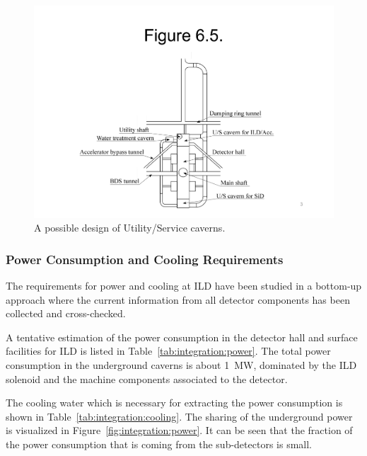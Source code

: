 \begin{figure}[h!]
\centering
\includegraphics[width=1.0\hsize]{Integration/fig/underground.pdf}
\caption{\label{fig:integration:USC}A possible design of Utility/Service caverns. }
\end{figure}

\subsubsection{Power Consumption and Cooling Requirements}
\label{ild:sec:power}
The requirements for power and cooling at ILD have been studied in a bottom-up approach where the current information from all detector components has been collected and cross-checked.

A tentative estimation of the power consumption in the detector hall and surface facilities for ILD is listed in Table~\ref{tab:integration:power}. The total power consumption in the underground caverns is about 1~MW, dominated by the ILD solenoid and the machine components associated to the detector. 

The cooling water which is necessary for extracting the power consumption is shown in Table~\ref{tab:integration:cooling}.
The sharing of the underground power is visualized in Figure~\ref{fig:integration:power}. It can be seen that the fraction of the power consumption that is coming from the sub-detectors is small.

